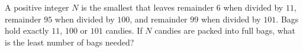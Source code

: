 A positive integer $N$ is the smallest that leaves remainder $6$ when divided by $11$, remainder $95$ when divided by $100$, and remainder $99$ when divided by $101$. Bags hold exactly $11$, $100$ or $101$ candies. If $N$ candies are packed into full bags, what is the least number of bags needed?
